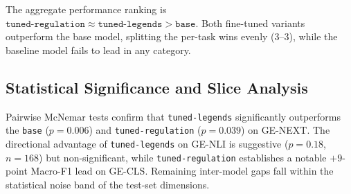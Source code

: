 \documentclass[pdflatex,sn-mathphys-num]{sn-jnl}%
\theoremstyle{thmstyleone}%
\theoremstyle{thmstyletwo}%
\theoremstyle{thmstylethree}%
\begin{document}
The aggregate performance ranking is $\texttt{tuned-regulation} \approx
\texttt{tuned-legends} > \texttt{base}$. Both fine-tuned variants outperform the
base model, splitting the per-task wins evenly (3--3), while the baseline model
fails to lead in any category.

\subsection{Statistical Significance and Slice Analysis}

Pairwise McNemar tests confirm that \texttt{tuned-legends} significantly
outperforms the \texttt{base} ($p = 0.006$) and \texttt{tuned-regulation} ($p =
0.039$) on GE-NEXT. The directional advantage of \texttt{tuned-legends} on
GE-NLI is suggestive ($p = 0.18$, $n = 168$) but non-significant, while
\texttt{tuned-regulation} establishes a notable $+9$-point Macro-F1 lead on
GE-CLS. Remaining inter-model gaps fall within the statistical noise band of the
test-set dimensions.
\end{document}
